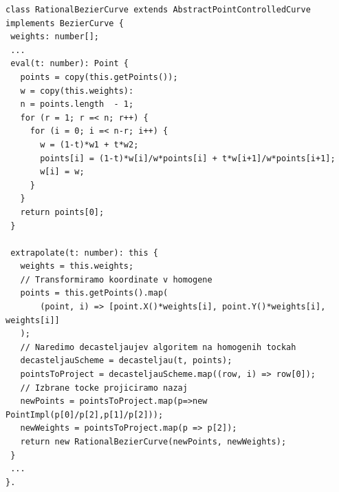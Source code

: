 \documentclass[isrm2, tisk]{fmfdelo}
\begin{document}
    \begin{lstlisting}[label={lst:rat-curve}]
class RationalBezierCurve extends AbstractPointControlledCurve implements BezierCurve {
 weights: number[];
 ...
 eval(t: number): Point {
   points = copy(this.getPoints());
   w = copy(this.weights):
   n = points.length  - 1;
   for (r = 1; r =< n; r++) {
     for (i = 0; i =< n-r; i++) {
       w = (1-t)*w1 + t*w2;
       points[i] = (1-t)*w[i]/w*points[i] + t*w[i+1]/w*points[i+1];
       w[i] = w;
     }
   }
   return points[0];
 }

 extrapolate(t: number): this {
   weights = this.weights;
   // Transformiramo koordinate v homogene
   points = this.getPoints().map(
       (point, i) => [point.X()*weights[i], point.Y()*weights[i], weights[i]]
   );
   // Naredimo decasteljaujev algoritem na homogenih tockah
   decasteljauScheme = decasteljau(t, points);
   pointsToProject = decasteljauScheme.map((row, i) => row[0]);
   // Izbrane tocke projiciramo nazaj
   newPoints = pointsToProject.map(p=>new PointImpl(p[0]/p[2],p[1]/p[2]));
   newWeights = pointsToProject.map(p => p[2]);
   return new RationalBezierCurve(newPoints, newWeights);
 }
 ...
}.
    \end{lstlisting}
\end{document}
